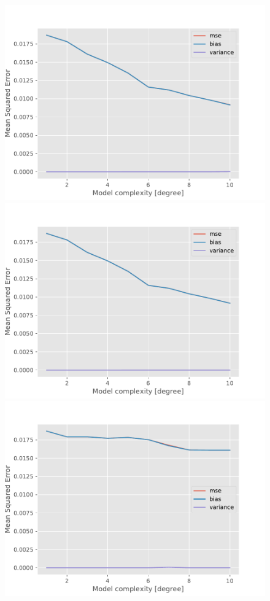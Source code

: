 \begin{figure}[!h]
    \centering
    \includegraphics[scale=0.48]{Figures/RealDataPlots/deg_analysis_ols_bias_variance_016.pdf}
    \includegraphics[scale=0.48]{Figures/RealDataPlots/deg_analysis_ridge_bias_variance_012.pdf}
    \includegraphics[scale=0.48]{Figures/RealDataPlots/deg_analysis_lasso_bias_variance_026.pdf}

\end{figure}
